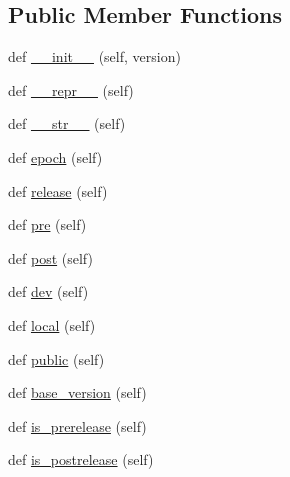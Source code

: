 \subsection*{Public Member Functions}
\begin{DoxyCompactItemize}
\item 
def \hyperlink{classsetuptools_1_1__vendor_1_1packaging_1_1version_1_1Version_ae8b2f8a830a6cf19c684030ff92c4671}{\+\_\+\+\_\+init\+\_\+\+\_\+} (self, version)
\item 
def \hyperlink{classsetuptools_1_1__vendor_1_1packaging_1_1version_1_1Version_a0d9472677e5b73b6603a86adee3b0eec}{\+\_\+\+\_\+repr\+\_\+\+\_\+} (self)
\item 
def \hyperlink{classsetuptools_1_1__vendor_1_1packaging_1_1version_1_1Version_ad7799d4b1432a9a0ec3f8569b61e94a1}{\+\_\+\+\_\+str\+\_\+\+\_\+} (self)
\item 
def \hyperlink{classsetuptools_1_1__vendor_1_1packaging_1_1version_1_1Version_aed95efa9e594d45c99537c777a4f35e4}{epoch} (self)
\item 
def \hyperlink{classsetuptools_1_1__vendor_1_1packaging_1_1version_1_1Version_a91bd6299b05c3223794b21f525694204}{release} (self)
\item 
def \hyperlink{classsetuptools_1_1__vendor_1_1packaging_1_1version_1_1Version_aac6f6e115a84a2061787b03580c7f3a6}{pre} (self)
\item 
def \hyperlink{classsetuptools_1_1__vendor_1_1packaging_1_1version_1_1Version_a73a0de7921f9f391b86236d0776ef846}{post} (self)
\item 
def \hyperlink{classsetuptools_1_1__vendor_1_1packaging_1_1version_1_1Version_a66600ec50a570aa66bdfc4633cc4fb76}{dev} (self)
\item 
def \hyperlink{classsetuptools_1_1__vendor_1_1packaging_1_1version_1_1Version_a1ca67c2cc35de1bf61b9e419f779c927}{local} (self)
\item 
def \hyperlink{classsetuptools_1_1__vendor_1_1packaging_1_1version_1_1Version_a578277f9d083813e22b4c9b898d32fa1}{public} (self)
\item 
def \hyperlink{classsetuptools_1_1__vendor_1_1packaging_1_1version_1_1Version_aa746c3c630ce6203fc91699975827ecd}{base\+\_\+version} (self)
\item 
def \hyperlink{classsetuptools_1_1__vendor_1_1packaging_1_1version_1_1Version_a86b6508470c8795b9dbc3951b4fd9390}{is\+\_\+prerelease} (self)
\item 
def \hyperlink{classsetuptools_1_1__vendor_1_1packaging_1_1version_1_1Version_a473df1b65542159470e42b342de3f123}{is\+\_\+postrelease} (self)

\end{DoxyCompactItemize}
